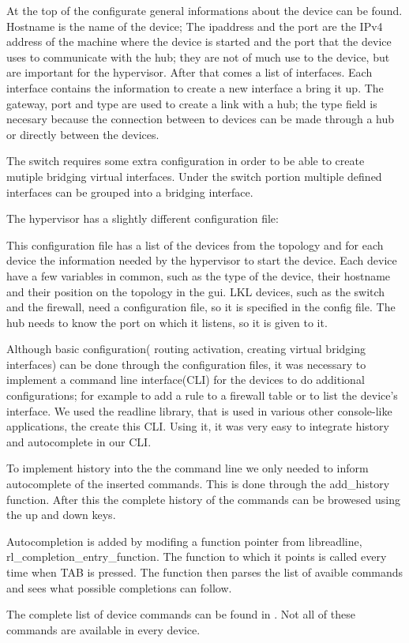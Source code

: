 At the top of the configurate general informations about the device can be found. Hostname is the name of the device;
The ipaddress and the port are the IPv4 address of the machine where the device is started and the port that the device
uses to communicate with the hub; they are not of much use to the device, but are important for the hypervisor.
After that comes a list of interfaces.	Each interface contains the information to create a new interface a bring it up.
The gateway, port and type are used to create a link with a hub; the type field is necesary because the connection between
to devices can be made through a hub or directly between the devices. 

The switch requires some extra configuration in order to be able to create mutiple bridging virtual interfaces. 
Under the switch portion multiple defined interfaces can be grouped into a bridging interface.

The hypervisor has a slightly different configuration file:
\lstset{language=inform,caption=Example hypervisor configuration file,label=lst:hconf}

This configuration file has a list of the devices from the topology and for each device the information needed by the hypervisor to
start the device. Each device have a few variables in common, such as the type of the device, their hostname and their position on
the topology in the gui. LKL devices, such as the switch and the firewall, need a configuration file, so it is specified in the
config file. The hub needs to know the port on which it listens, so it is given to it.

Although basic configuration( routing activation, creating virtual bridging interfaces) can be done through the 
configuration files, it was necessary to implement a command line interface(CLI) for the devices to do additional configurations; 
for example to add a rule to a firewall table or to list the device's interface. We used the readline library, that is used in various
other console-like applications, the create this CLI. Using it, it was very easy to integrate history and autocomplete in our CLI.

To implement history into the the command line we only needed to inform autocomplete of the inserted commands. This is done through the
add_history function. After this the complete history of the commands can be browesed using the up and down keys.

Autocompletion is added by modifing a function pointer from libreadline, rl_completion_entry_function. The function to which it points
is called every time when TAB is pressed. The function then parses the list of avaible commands and sees what possible completions
can follow. 

The complete list of device commands can be found in . Not all of these commands are available in every device.
